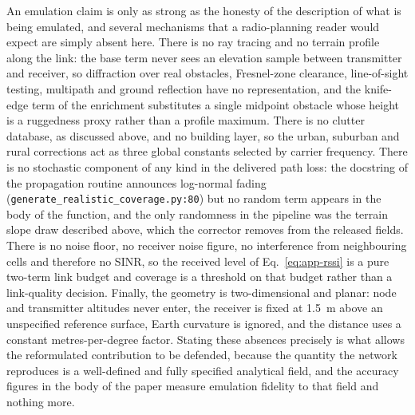 An emulation claim is only as strong as the honesty of the description of
what is being emulated, and several mechanisms that a radio-planning reader
would expect are simply absent here. There is no ray tracing and no terrain
profile along the link: the base term never sees an elevation sample
between transmitter and receiver, so diffraction over real obstacles,
Fresnel-zone clearance, line-of-sight testing, multipath and ground
reflection have no representation, and the knife-edge term of the
enrichment substitutes a single midpoint obstacle whose height is a
ruggedness proxy rather than a profile maximum. There is no clutter
database, as discussed above, and no building layer, so the urban,
suburban and rural corrections act as three global constants selected by
carrier frequency. There is no stochastic component of any kind in the
delivered path loss: the docstring of the propagation routine announces
log-normal fading (\texttt{generate\_\allowbreak{}realistic\_\allowbreak{}coverage\allowbreak{}.py:\allowbreak{}80}) but no
random term appears in the body of the function, and the only randomness in
the pipeline was the terrain slope draw described above, which the corrector
removes from the released fields. There is no noise floor, no
receiver noise figure, no interference from neighbouring cells and
therefore no SINR, so the received level of Eq.~\eqref{eq:app-rssi} is a
pure two-term link budget and coverage is a threshold on that budget rather
than a link-quality decision. Finally, the geometry is two-dimensional and
planar: node and transmitter altitudes never enter, the receiver is fixed
at 1.5~m above an unspecified reference surface, Earth curvature is
ignored, and the distance uses a constant metres-per-degree factor. Stating
these absences precisely is what allows the reformulated contribution to be
defended, because the quantity the network reproduces is a well-defined and
fully specified analytical field, and the accuracy figures in the body of
the paper measure emulation fidelity to that field and nothing more.
